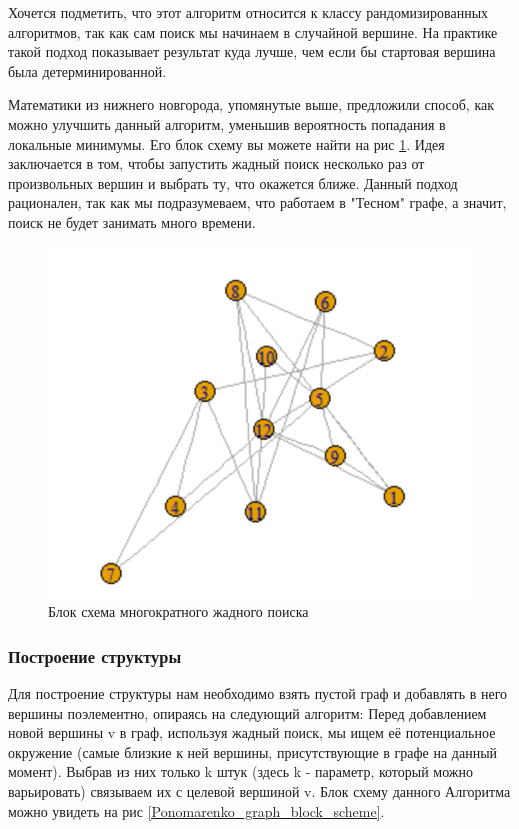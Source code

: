 Хочется подметить, что этот алгоритм относится к классу рандомизированных алгоритмов,
так как сам поиск мы начинаем в случайной вершине. На практике такой подход показывает
результат куда лучше, чем если бы стартовая вершина была детерминированной.


Математики из нижнего новгорода, упомянутые выше, предложили способ, как можно улучшить
данный алгоритм, уменьшив вероятность попадания в локальные минимумы. Его блок схему
вы можете найти на рис \ref{multi_search_block_scheme}. Идея заключается в том, чтобы
запустить жадный поиск несколько раз от произвольных вершин и выбрать ту, что окажется ближе.
Данный подход рационален, так как мы подразумеваем, что работаем в "Тесном" графе, а значит,
поиск не будет занимать много времени.

\begin{figure}[H]
    \centering
    \includegraphics[scale=0.3]{./pictures/random_graph.png}
    \caption{Блок схема многократного жадного поиска} \label{multi_search_block_scheme}
\end{figure}

\subsubsection{Построение структуры}

Для построение структуры нам необходимо взять пустой граф и добавлять в него вершины
поэлементно, опираясь на следующий алгоритм: Перед добавлением новой вершины v в граф, 
используя жадный поиск, мы ищем её потенциальное окружение (самые близкие к ней вершины,
присутствующие в графе на данный момент). Выбрав из них только k штук (здесь k - параметр, который
можно варьировать) связываем их с целевой вершиной v. Блок схему данного Алгоритма можно
увидеть на рис \ref{Ponomarenko_graph_block_scheme}.

